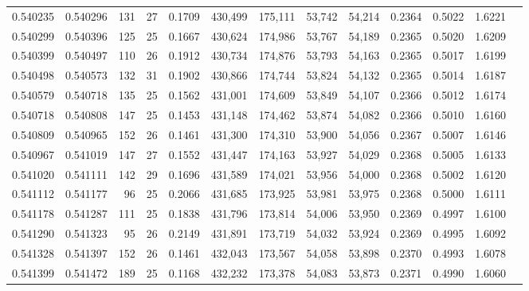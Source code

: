 \begin{tabular}{rrrrrrrrrrrrr}
0.540235 & 0.540296 & 131 &  27 &                                     0.1709 & 430,499 & 175,111 &  53,742 &  54,214 & 0.2364 & 0.5022 & 1.6221 \\
0.540299 & 0.540396 & 125 &  25 &                                     0.1667 & 430,624 & 174,986 &  53,767 &  54,189 & 0.2365 & 0.5020 & 1.6209 \\
0.540399 & 0.540497 & 110 &  26 &                                     0.1912 & 430,734 & 174,876 &  53,793 &  54,163 & 0.2365 & 0.5017 & 1.6199 \\
0.540498 & 0.540573 & 132 &  31 &                                     0.1902 & 430,866 & 174,744 &  53,824 &  54,132 & 0.2365 & 0.5014 & 1.6187 \\
0.540579 & 0.540718 & 135 &  25 &                                     0.1562 & 431,001 & 174,609 &  53,849 &  54,107 & 0.2366 & 0.5012 & 1.6174 \\
0.540718 & 0.540808 & 147 &  25 &                                     0.1453 & 431,148 & 174,462 &  53,874 &  54,082 & 0.2366 & 0.5010 & 1.6160 \\
0.540809 & 0.540965 & 152 &  26 &                                     0.1461 & 431,300 & 174,310 &  53,900 &  54,056 & 0.2367 & 0.5007 & 1.6146 \\
0.540967 & 0.541019 & 147 &  27 &                                     0.1552 & 431,447 & 174,163 &  53,927 &  54,029 & 0.2368 & 0.5005 & 1.6133 \\
0.541020 & 0.541111 & 142 &  29 &                                     0.1696 & 431,589 & 174,021 &  53,956 &  54,000 & 0.2368 & 0.5002 & 1.6120 \\
0.541112 & 0.541177 &  96 &  25 &                                     0.2066 & 431,685 & 173,925 &  53,981 &  53,975 & 0.2368 & 0.5000 & 1.6111 \\
0.541178 & 0.541287 & 111 &  25 &                                     0.1838 & 431,796 & 173,814 &  54,006 &  53,950 & 0.2369 & 0.4997 & 1.6100 \\
0.541290 & 0.541323 &  95 &  26 &                                     0.2149 & 431,891 & 173,719 &  54,032 &  53,924 & 0.2369 & 0.4995 & 1.6092 \\
0.541328 & 0.541397 & 152 &  26 &                                     0.1461 & 432,043 & 173,567 &  54,058 &  53,898 & 0.2370 & 0.4993 & 1.6078 \\
0.541399 & 0.541472 & 189 &  25 &                                     0.1168 & 432,232 & 173,378 &  54,083 &  53,873 & 0.2371 & 0.4990 & 1.6060 \\

\end{tabular}
